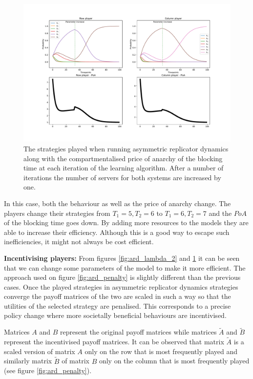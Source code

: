 \begin{figure}[H]
    \includegraphics[width=\textwidth]{imgs/asymmetric_rd_and_PoA/asymmetric_increase_C.pdf}
    \caption{
        The strategies played when running asymmetric replicator dynamics
        along with the compartmentalised price of anarchy of the blocking time 
        at each iteration of the learning algorithm. After a number of 
        iterations the number of servers for both systems are increased by one.
    }
    \label{fig:ard_num_of_servers}
\end{figure}

In this case, both the behaviour as well as the price of anarchy change.
The players change their strategies from \(T_1 = 5, T_2 = 6\) to 
\(T_1 = 6, T_2 = 7\) and the \(PoA\) of the blocking time goes down.
By adding more resources to the models they are able to increase their 
efficiency.
Although this is a good way to escape such inefficiencies, it might not always
be cost efficient.

\textbf{Incentivising players:}
From figures \ref{fig:ard_lambda_2} and \ref{fig:ard_num_of_servers} it can be
seen that we can change some parameters of the model to make it more efficient.
The approach used on figure \ref{fig:ard_penalty} is slightly different than 
the previous cases.
Once the played strategies in asymmetric replicator dynamics strategies 
converge the payoff matrices of the two are scaled in such a way so that the 
utilities of the selected strategy are penalised. This corresponds to a precise
policy change where more societally beneficial behaviours are incentivised.

Matrices \(A\) and \(B\) represent the original payoff matrices while matrices
\(\tilde{A}\) and \(\tilde{B}\) represent the incentivised payoff matrices.
It can be observed that matrix \(\tilde{A}\) is a scaled version of matrix 
\(A\) only on the row that is most frequently played and similarly matrix 
\(\tilde{B}\) of matrix \(B\) only on the column that is most frequently played
(see figure \ref{fig:ard_penalty}).

